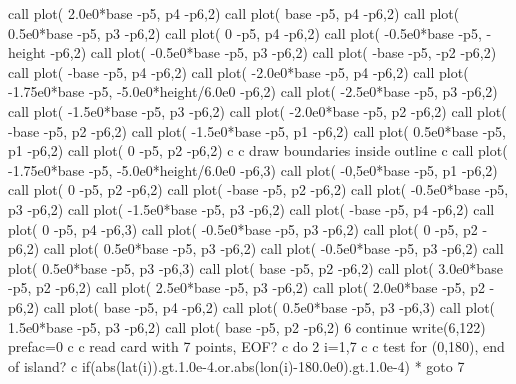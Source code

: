       call plot( 2.0e0*base   -p5, p4                  -p6,2)
      call plot( base         -p5, p4                  -p6,2)
      call plot( 0.5e0*base   -p5, p3                  -p6,2)
      call plot( 0            -p5, p4                  -p6,2)
      call plot( -0.5e0*base  -p5, -height             -p6,2)
      call plot( -0.5e0*base  -p5, p3                  -p6,2)
      call plot( -base        -p5, -p2                 -p6,2)
      call plot( -base        -p5, p4                  -p6,2)
      call plot( -2.0e0*base  -p5, p4                  -p6,2)
      call plot( -1.75e0*base -p5, -5.0e0*height/6.0e0 -p6,2)
      call plot( -2.5e0*base  -p5, p3                  -p6,2)
      call plot( -1.5e0*base  -p5, p3                  -p6,2)
      call plot( -2.0e0*base  -p5, p2                  -p6,2)
      call plot( -base        -p5, p2                  -p6,2)
      call plot( -1.5e0*base  -p5, p1                  -p6,2)
      call plot( 0.5e0*base   -p5, p1                  -p6,2)
      call plot( 0            -p5, p2                  -p6,2)
c
c draw boundaries inside outline
c
      call plot( -1.75e0*base -p5, -5.0e0*height/6.0e0 -p6,3)
      call plot( -0,5e0*base  -p5, p1                  -p6,2)
      call plot( 0            -p5, p2                  -p6,2)
      call plot( -base        -p5, p2                  -p6,2)
      call plot( -0.5e0*base  -p5, p3                  -p6,2)
      call plot( -1.5e0*base  -p5, p3                  -p6,2)
      call plot( -base        -p5, p4                  -p6,2)
      call plot( 0            -p5, p4                  -p6,3)
      call plot( -0.5e0*base  -p5, p3                  -p6,2)
      call plot( 0            -p5, p2                  -p6,2)
      call plot( 0.5e0*base   -p5, p3                  -p6,2)
      call plot( -0.5e0*base  -p5, p3                  -p6,2)
      call plot( 0.5e0*base   -p5, p3                  -p6,3)
      call plot( base         -p5, p2                  -p6,2)
      call plot( 3.0e0*base   -p5, p2                  -p6,2)
      call plot( 2.5e0*base   -p5, p3                  -p6,2)
      call plot( 2.0e0*base   -p5, p2                  -p6,2)
      call plot( base         -p5, p4                  -p6,2)
      call plot( 0.5e0*base   -p5, p3                  -p6,3)
      call plot( 1.5e0*base   -p5, p3                  -p6,2)
      call plot( base         -p5, p2                  -p6,2)
6     continue
      write(6,122)
      prefac=0
c
c read card with 7 points, EOF?
c
      do 2 i=1,7
c
c test for (0,180), end of island?
c
      if(abs(lat(i)).gt.1.0e-4.or.abs(lon(i)-180.0e0).gt.1.0e-4)
     *  goto 7
